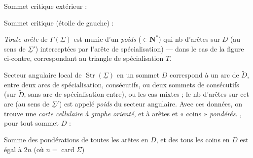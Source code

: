 \documentclass[11pt,a4paper]{article}
\begin{document}
Sommet critique extérieur :

Sommet critique (étoile de gauche) :

\emph{Toute arête} de $\Gamma(\underline{\Sigma})$ est munie d'un \emph{poids} ($\in \mathbf{N}^{*}$) qui   nb d'arêtes sur $D$ (au sens de $\underline{\Sigma}'$) interceptées par l'arête de spécialisation) --- dans le cas de la figure ci-contre, correspondant au triangle de spécialisation $T$.

 Secteur angulaire local de $\operatorname{Str}(\underline{\Sigma})$ en un sommet $D$ correspond à un arc de $\widetilde{D}$,   entre deux arcs de spécialisation, consécutifs, ou deux  sommets de   consécutifs (sur $\widetilde{D}$, sans arc de spécialisation entre), ou les cas mixtes ; le nb d'arêtes sur cet arc (au sens de $\underline{\Sigma}'$) est appelé \emph{poids} du secteur angulaire. Avec ces données, on trouve une \emph{carte cellulaire}  \emph{à graphe orienté}, et à arêtes et « coins » \emph{pondérés}. , pour tout sommet $D$ :

\struck{\ill{}} Somme des pondérations de toutes les arêtes en $D$, et des  tous les coins en $D$ \struck{\ill{}} est égal à $2n$ (où $n = \operatorname{card} \Sigma$)
\end{document}
